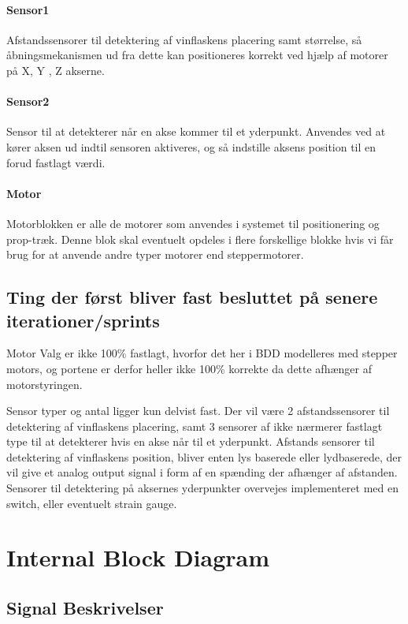 \paragraph{Sensor1} Afstandssensorer til detektering af vinflaskens placering samt størrelse, så åbningsmekanismen ud fra dette kan positioneres korrekt ved hjælp af motorer på X, Y , Z akserne.

\paragraph{Sensor2} Sensor til at detekterer når en akse kommer til et yderpunkt. Anvendes ved at kører aksen ud indtil sensoren aktiveres, og så indstille aksens position til en forud fastlagt værdi.

\paragraph{Motor} Motorblokken er alle de motorer som anvendes i systemet til positionering og prop-træk. Denne blok skal eventuelt opdeles i flere forskellige blokke hvis vi får brug for at anvende andre typer motorer end steppermotorer.

\subsection{Ting der først bliver fast besluttet på senere iterationer/sprints}

Motor Valg er ikke 100\% fastlagt, hvorfor det her i BDD modelleres med stepper motors, og portene er derfor heller ikke 100\% korrekte da dette afhænger af motorstyringen.

Sensor typer og antal ligger kun delvist fast. Der vil være 2 afstandssensorer til detektering af vinflaskens placering, samt 3 sensorer af ikke nærmerer fastlagt type til at detekterer hvis en akse når til et yderpunkt. Afstands sensorer til detektering af vinflaskens position, bliver enten lys baserede eller lydbaserede, der vil give et analog output signal i form af en spænding der afhænger af afstanden. Sensorer til detektering på aksernes yderpunkter overvejes implementeret med en switch, eller eventuelt strain gauge.

\section{Internal Block Diagram}

\subsection{Signal Beskrivelser}

